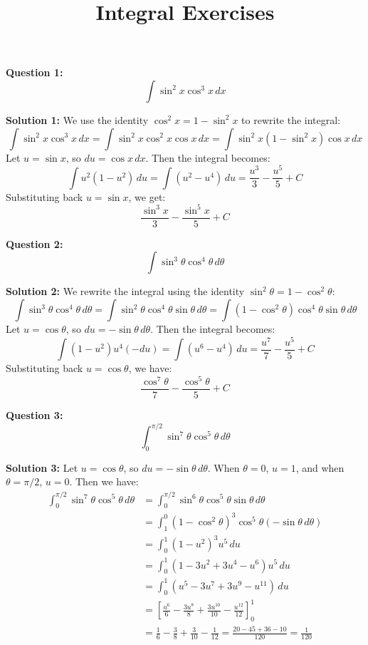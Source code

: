 \documentclass{article}
\title{Integral Exercises}
\author{}
\date{}
\begin{document}
\maketitle

\textbf{Question 1:}
\[ \int \sin^2 x \cos^3 x \, dx \]

\textbf{Solution 1:}
We use the identity $\cos^2 x = 1 - \sin^2 x$ to rewrite the integral:
\[ \int \sin^2 x \cos^3 x \, dx = \int \sin^2 x \cos^2 x \cos x \, dx = \int \sin^2 x (1 - \sin^2 x) \cos x \, dx \]
Let $u = \sin x$, so $du = \cos x \, dx$. Then the integral becomes:
\[ \int u^2 (1 - u^2) \, du = \int (u^2 - u^4) \, du = \frac{u^3}{3} - \frac{u^5}{5} + C \]
Substituting back $u = \sin x$, we get:
\[ \frac{\sin^3 x}{3} - \frac{\sin^5 x}{5} + C \]

\bigskip

\textbf{Question 2:}
\[ \int \sin^3 \theta \cos^4 \theta \, d\theta \]

\textbf{Solution 2:}
We rewrite the integral using the identity $\sin^2 \theta = 1 - \cos^2 \theta$:
\[ \int \sin^3 \theta \cos^4 \theta \, d\theta = \int \sin^2 \theta \cos^4 \theta \sin \theta \, d\theta = \int (1 - \cos^2 \theta) \cos^4 \theta \sin \theta \, d\theta \]
Let $u = \cos \theta$, so $du = -\sin \theta \, d\theta$.  Then the integral becomes:
\[ \int (1 - u^2) u^4 (-du) = \int (u^6 - u^4) \, du = \frac{u^7}{7} - \frac{u^5}{5} + C \]
Substituting back $u = \cos \theta$, we have:
\[ \frac{\cos^7 \theta}{7} - \frac{\cos^5 \theta}{5} + C \]

\bigskip

\textbf{Question 3:}
\[ \int_0^{\pi/2} \sin^7 \theta \cos^5 \theta \, d\theta \]

\textbf{Solution 3:}
Let $u = \cos \theta$, so $du = -\sin \theta \, d\theta$. When $\theta = 0$, $u = 1$, and when $\theta = \pi/2$, $u = 0$.  Then we have:
\begin{align*} \int_0^{\pi/2} \sin^7 \theta \cos^5 \theta \, d\theta &= \int_0^{\pi/2} \sin^6 \theta \cos^5 \theta \sin \theta \, d\theta \\ &= \int_1^0 (1 - \cos^2 \theta)^3 \cos^5 \theta (-\sin \theta \, d\theta) \\ &= \int_0^1 (1 - u^2)^3 u^5 \, du \\ &= \int_0^1 (1 - 3u^2 + 3u^4 - u^6) u^5 \, du \\ &= \int_0^1 (u^5 - 3u^7 + 3u^9 - u^{11}) \, du \\ &= \left[ \frac{u^6}{6} - \frac{3u^8}{8} + \frac{3u^{10}}{10} - \frac{u^{12}}{12} \right]_0^1 \\ &= \frac{1}{6} - \frac{3}{8} + \frac{3}{10} - \frac{1}{12} = \frac{20 - 45 + 36 - 10}{120} = \frac{1}{120}\end{align*} 
\end{document}
